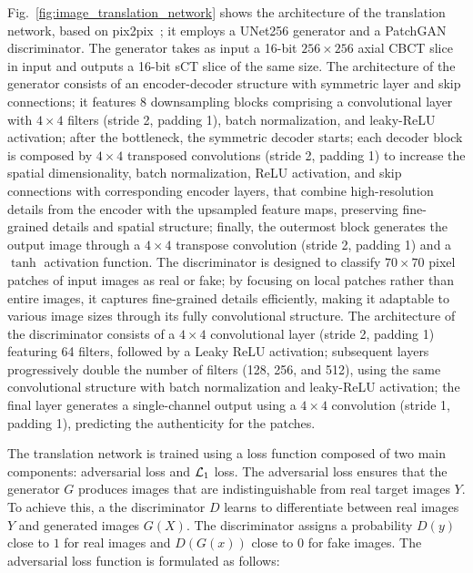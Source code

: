 Fig.~\ref{fig:image_translation_network} shows the architecture of the translation network, based on pix2pix~\cite{isola2017image}; it employs a UNet256 generator and a PatchGAN discriminator.
The generator takes as input a 16-bit $256 \times 256$ axial CBCT slice in input and outputs a 16-bit sCT slice of the same size.
The architecture of the generator consists of an encoder-decoder structure with symmetric layer and skip connections; it features $8$ downsampling blocks comprising a convolutional layer with $4\times4$ filters (stride 2, padding 1), batch normalization, and leaky-ReLU activation; after the bottleneck, the symmetric decoder starts; each decoder block is composed by $4\times4$ transposed convolutions (stride 2, padding 1) to increase the spatial dimensionality, batch normalization, ReLU activation, and skip connections with corresponding encoder layers, that combine high-resolution details from the encoder with the upsampled feature maps, preserving fine-grained details and spatial structure; finally, the outermost block generates the output image through a $4\times4$ transpose convolution (stride 2, padding 1) and a $\tanh$ activation function.
The discriminator is designed to classify $70\times70$ pixel patches of input images as real or fake; by focusing on local patches rather than entire images, it captures fine-grained details efficiently, making it adaptable to various image sizes through its fully convolutional structure.
The architecture of the discriminator consists of a $4\times4$ convolutional layer (stride 2, padding 1) featuring 64 filters, followed by a Leaky ReLU activation; subsequent layers progressively double the number of filters (128, 256, and 512), using the same convolutional structure with batch normalization and leaky-ReLU activation; the final layer generates a single-channel output using a $4\times4$ convolution (stride 1, padding 1), predicting the authenticity for the patches.

The translation network is trained using a loss function composed of two main components: adversarial loss and $\mathcal{L}_1$ loss.
The adversarial loss ensures that the generator \( G \) produces images that are indistinguishable from real target images \( Y \). To achieve this, a the discriminator \( D \) learns to differentiate between real images \( Y \) and generated images \( G(X) \). The discriminator assigns a probability \( D(y) \) close to \(1\) for real images and \( D(G(x)) \) close to \(0\) for fake images.
The adversarial loss function is formulated as follows:


